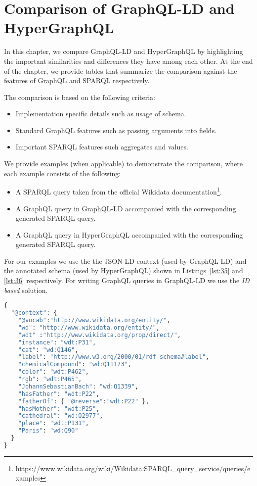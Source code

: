 \chapter{Comparison of GraphQL-LD and HyperGraphQL}
\label{ch:5}
In this chapter, we compare GraphQL-LD and HyperGraphQL by highlighting the important similarities and differences they have among each other. At the end of the chapter, we provide tables that summarize the comparison against the features of GraphQL and SPARQL respectively.

The comparison is based on the following criteria:
\begin{itemize}
\item Implementation specific details such as usage of schema.
\item Standard GraphQL features such as passing arguments into fields.
\item Important SPARQL features such aggregates and values.
\end{itemize}

We provide examples (when applicable) to demonstrate the comparison, where each example consists of the following:

\begin{itemize}
\item A SPARQL query taken from the official Wikidata documentation\footnote{https://www.wikidata.org/wiki/Wikidata:SPARQL\_query\_service/queries/examples}.
\item A GraphQL query in GraphQL-LD accompanied with the corresponding generated SPARQL query.
\item A GraphQL query in HyperGraphQL accompanied with the corresponding generated SPARQL query.
\end{itemize}

For our examples we use the the JSON-LD context (used by GraphQL-LD) and the annotated schema (used by HyperGraphQL) shown in Listings~\ref{lst:35} and \ref{lst:36} respectively. For writing GraphQL queries in GraphQL-LD we use the \textit{ID based} solution.

\begin{minipage}{\linewidth}
\begin{lstlisting}[label=lst:35, caption={JSON-LD Context in GrahQL-LD}, language=GraphQL]
{
  "@context": {
  	"@vocab":"http://www.wikidata.org/entity/", 
  	"wd": "http://www.wikidata.org/entity/",
  	"wdt" :"http://www.wikidata.org/prop/direct/",
  	"instance": "wdt:P31",
  	"cat": "wd:Q146",
  	"label": "http://www.w3.org/2000/01/rdf-schema#label",
  	"chemicalCompound": "wd:Q11173",
  	"color": "wdt:P462",
  	"rgb": "wdt:P465",
  	"JohannSebastianBach": "wd:Q1339",
  	"hasFather": "wdt:P22",
  	"fatherOf": { "@reverse":"wdt:P22" },
  	"hasMother": "wdt:P25",
  	"cathedral": "wd:Q2977",
  	"place": "wdt:P131",
  	"Paris": "wd:Q90"
  }
}
\end{lstlisting}
\end{minipage}


